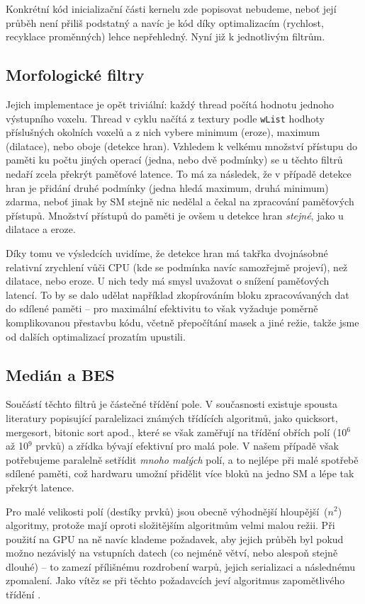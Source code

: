     Konkrétní kód inicializační části kernelu zde popisovat nebudeme, neboť její průběh není přiliš podstatný a navíc je kód díky optimalizacím (rychlost, recyklace proměnných) lehce nepřehledný. Nyní již k jednotlivým filtrům.

    \subsection{Morfologické filtry}

    Jejich implementace je opět triviální: každý thread počítá hodnotu jednoho výstupního voxelu. Thread v cyklu načítá z textury podle {\tt wList} hodhoty příslušných okolních voxelů a z nich vybere minimum (eroze), maximum (dilatace), nebo oboje (detekce hran). Vzhledem k velkému množství přístupu do paměti ku počtu jiných operací (jedna, nebo dvě podmínky) se u těchto filtrů nedaří zcela překrýt paměťové latence. To má za následek, že v případě detekce hran je přidání druhé podmínky (jedna hledá maximum, druhá minimum) \bq zdarma\eq, neboť jinak by SM stejně nic nedělal a čekal na zpracování paměťových přístupů. Množství přístupů do paměti je ovšem u detekce hran \emph{stejné}, jako u dilatace a eroze.

    Díky tomu ve výsledcích uvidíme, že detekce hran má takřka dvojnásobné relativní zrychlení vůči CPU (kde se podmínka navíc samozřejmě projeví), než dilatace, nebo eroze. U nich tedy má smysl uvažovat o snížení paměťových latencí. To by se dalo udělat například zkopírováním bloku zpracovávaných dat do sdílené paměti -- pro maximální efektivitu to však vyžaduje poměrně komplikovanou přestavbu kódu, včetně přepočítání masek a jiné režie, takže jsme od dalších optimalizací prozatím upustili.

    \subsection{Medián a BES}

    Součástí těchto filtrů je částečné třídění pole. V současnosti existuje spousta literatury popisující paralelizaci známých třídících algoritmů, jako quicksort, mergesort, bitonic sort apod., které se však zaměřují na třídění obřích polí (10$^6$ až 10$^9$ prvků) a zřídka bývají efektivní pro malá pole. V našem případě však potřebujeme paralelně setřídit \emph{mnoho malých} polí, a to nejlépe při malé spotřebě sdílené paměti, což hardwaru umožní přidělit více bloků na jedno SM a lépe tak překrýt latence.

    Pro malé velikosti polí (destíky prvků) jsou obecně výhodnější \bq hloupější\eq ~\OOO($n^2$) algoritmy, protože mají oproti složitějším algoritmům velmi malou režii. Při použití na GPU na ně navíc klademe požadavek, aby jejich průběh byl pokud možno nezávislý na vstupních datech (co nejméně větví, nebo alespoň stejně dlouhé) -- to zamezí přílišnému rozdrobení warpů, jejich serializaci a následnému zpomalení. Jako vítěz se při těchto požadavcích jeví algoritmus zapomětlivého třídění \cite{Forgetful}.

